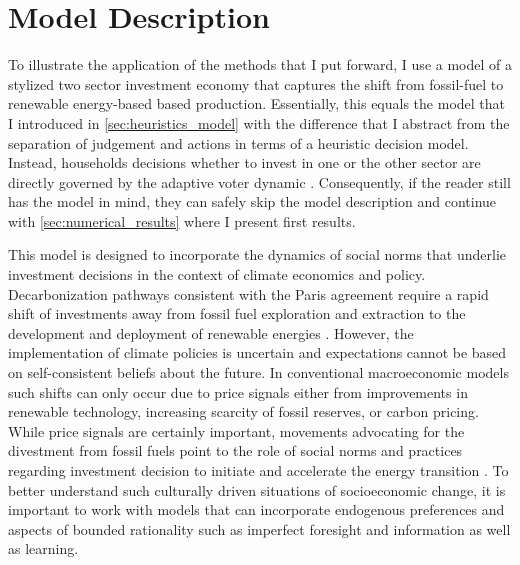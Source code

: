 \section{Model Description}
\label{sec:approx_Model_Description}

To illustrate the application of the methods that I put forward, I use a model of a stylized two sector investment economy that captures the shift from fossil-fuel to renewable energy-based based production. Essentially, this equals the model that I introduced in \cref{sec:heuristics_model} with the difference that I abstract from the separation of judgement and actions in terms of a heuristic decision model. Instead, households decisions whether to invest in one or the other sector are directly governed by the adaptive voter dynamic \citep{Holme2006a}.
Consequently, if the reader still has the model in mind, they can safely skip the model description and continue with \cref{sec:numerical_results} where I present first results.

This model is designed to incorporate the dynamics of social norms that underlie investment decisions in the context of climate economics and policy. Decarbonization pathways consistent with the Paris agreement require a rapid shift of investments away from fossil fuel exploration and extraction to the development and deployment of renewable energies \citep{IPCC2014}. However, the implementation of climate policies is uncertain and expectations cannot be based on self-consistent beliefs about the future.  In conventional macroeconomic models such shifts can only occur due to price signals either from improvements in renewable technology, increasing scarcity of fossil reserves, or carbon pricing. While price signals are certainly important, movements advocating for the divestment from fossil fuels point to the role of social norms and practices regarding investment decision to initiate and accelerate the energy transition \citep{Ans2013,Nyborg2016}. To better understand such culturally driven situations of socioeconomic change, it is important to work with models that can incorporate endogenous preferences and aspects of bounded rationality such as imperfect foresight and information as well as learning.
\label{sec:approx_economy}

